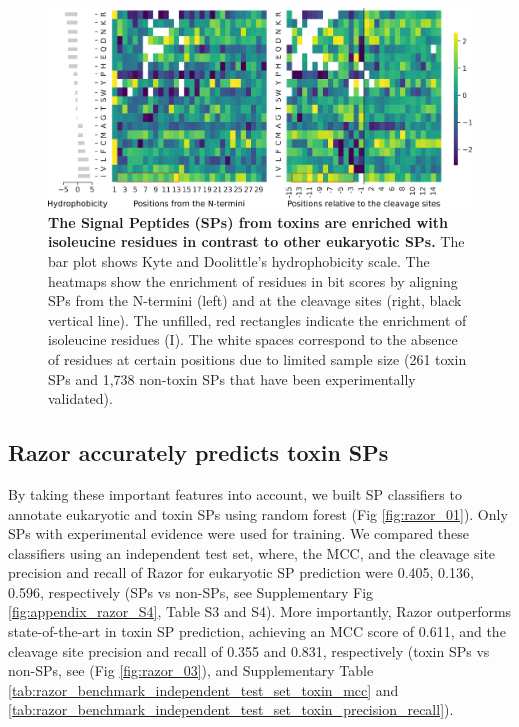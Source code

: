 \begin{figure}[!hbtp]
\centerline{\includegraphics[width=1\textwidth]{chapters/Signal_Peptide/Figures/fig1_bitscore_heatmap_toxin.png}}
\caption[The Signal Peptides (SPs) from toxins are enriched with isoleucine residues in contrast to other eukaryotic SPs.]{\textbf{The Signal Peptides (SPs) from toxins are enriched with isoleucine residues in contrast to other eukaryotic SPs.} The bar plot shows Kyte and Doolittle’s hydrophobicity scale. The heatmaps show the enrichment of residues in bit scores by aligning SPs from the N-termini (left) and at the cleavage sites (right, black vertical line). The unfilled, red rectangles indicate the enrichment of isoleucine residues (I). The white spaces correspond to the absence of residues at certain positions due to limited sample size (261 toxin SPs and 1,738 non-toxin SPs that have been experimentally validated).
}\label{fig:razor_02}
\end{figure}



\subsection{Razor accurately predicts toxin SPs}
By taking these important features into account, we built SP classifiers to annotate eukaryotic and toxin SPs using random forest (Fig \ref{fig:razor_01}). Only SPs with experimental evidence were used for training. We compared these classifiers using an independent test set, where, the MCC, and the cleavage site precision and recall of Razor for eukaryotic SP prediction were 0.405, 0.136, 0.596, respectively (SPs vs non-SPs, see Supplementary Fig \ref{fig:appendix_razor_S4}, Table S3 and S4). More importantly, Razor outperforms state-of-the-art in toxin SP prediction, achieving an MCC score of 0.611, and the cleavage site precision and recall of 0.355 and 0.831, respectively (toxin SPs vs non-SPs, see (Fig \ref{fig:razor_03}), and Supplementary Table \ref{tab:razor_benchmark_independent_test_set_toxin_mcc} and \ref{tab:razor_benchmark_independent_test_set_toxin_precision_recall}).



